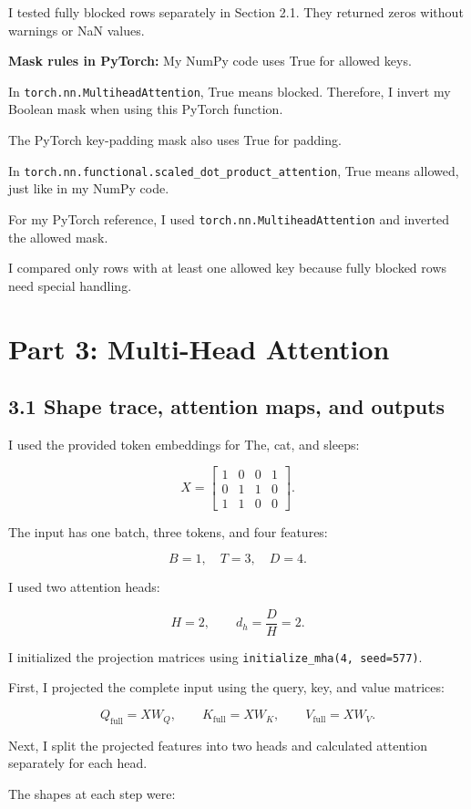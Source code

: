 \documentclass[11pt]{article}
\begin{document}
I tested fully blocked rows separately in
Section 2.1. They returned zeros without
warnings or NaN values.

\textbf{Mask rules in PyTorch:} My NumPy code uses True for allowed keys.

In \texttt{torch.nn.MultiheadAttention},
True means blocked. Therefore, I invert my
Boolean mask when using this PyTorch function.

The PyTorch key-padding mask also uses True
for padding.

In \texttt{torch.nn.functional.scaled\_dot\_product\_attention},
True means allowed, just like in my NumPy code.

For my PyTorch reference, I used
\texttt{torch.nn.MultiheadAttention} and inverted
the allowed mask.

I compared only rows with at least one allowed
key because fully blocked rows need special handling.
\section*{Part 3: Multi-Head Attention}
\subsection*{3.1 Shape trace, attention maps, and outputs}
I used the provided token embeddings for
The, cat, and sleeps:

\[
X=
\begin{bmatrix}
1&0&0&1\\
0&1&1&0\\
1&1&0&0
\end{bmatrix}.
\]

The input has one batch, three tokens, and
four features:

\[
B=1,\quad T=3,\quad D=4.
\]

I used two attention heads:

\[
H=2,\qquad d_h=\frac{D}{H}=2.
\]

I initialized the projection matrices using
\texttt{initialize\_mha(4, seed=577)}.

First, I projected the complete input using
the query, key, and value matrices:

\[
Q_{\mathrm{full}}=XW_Q,\qquad
K_{\mathrm{full}}=XW_K,\qquad
V_{\mathrm{full}}=XW_V.
\]

Next, I split the projected features into
two heads and calculated attention separately
for each head.

The shapes at each step were:
\end{document}
